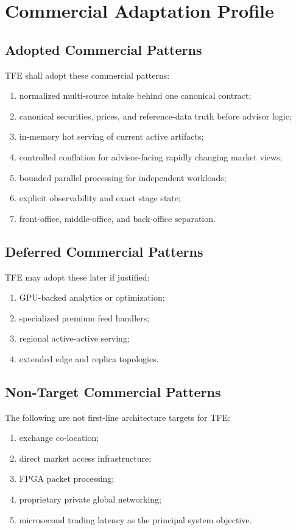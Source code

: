 \chapter{Commercial Adaptation Profile}
\section{Adopted Commercial Patterns}
TFE shall adopt these commercial patterns:
\begin{enumerate}[leftmargin=1.2cm]
    \item normalized multi-source intake behind one canonical contract;
    \item canonical securities, prices, and reference-data truth before advisor logic;
    \item in-memory hot serving of current active artifacts;
    \item controlled conflation for advisor-facing rapidly changing market views;
    \item bounded parallel processing for independent workloads;
    \item explicit observability and exact stage state;
    \item front-office, middle-office, and back-office separation.
\end{enumerate}

\section{Deferred Commercial Patterns}
TFE may adopt these later if justified:
\begin{enumerate}[leftmargin=1.2cm]
    \item GPU-backed analytics or optimization;
    \item specialized premium feed handlers;
    \item regional active-active serving;
    \item extended edge and replica topologies.
\end{enumerate}

\section{Non-Target Commercial Patterns}
The following are not first-line architecture targets for TFE:
\begin{enumerate}[leftmargin=1.2cm]
    \item exchange co-location;
    \item direct market access infrastructure;
    \item FPGA packet processing;
    \item proprietary private global networking;
    \item microsecond trading latency as the principal system objective.
\end{enumerate}
